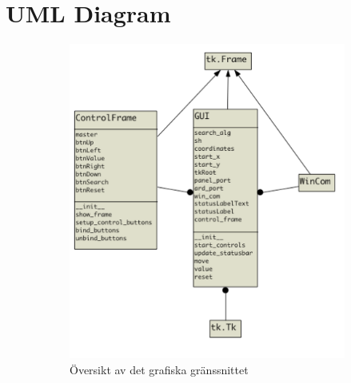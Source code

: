 \section{UML Diagram} %
\label{sec:uml_diagram}

\begin{figure}[h]
    \centering
    \begin{subfigure}{0.49\textwidth}
        \includegraphics[width=\textwidth]{res/img/GUI_uml}
        \caption{Översikt av det grafiska gränssnittet}
    \end{subfigure}
    \begin{subfigure}{0.49\textwidth}

\end{subfigure}
\end{figure}
